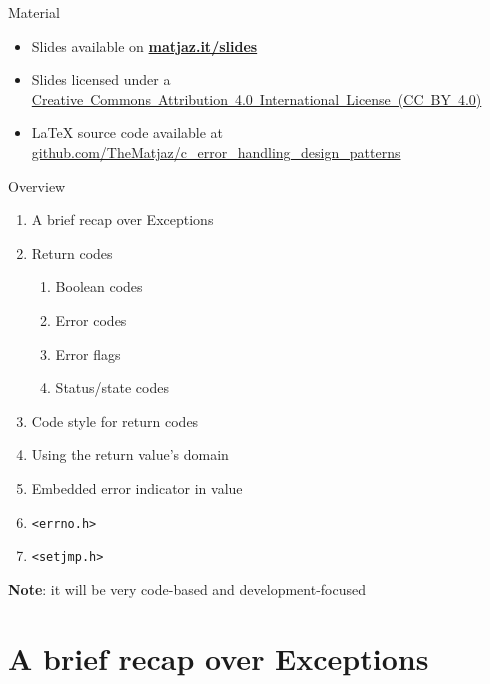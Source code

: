 \documentclass[aspectratio=169,14pt]{beamer}
\begin{document}
\begin{frame}
\titlepage
\end{frame}



\begin{frame}[label=material]{Material}
\begin{itemize}
    \item Slides available on \href{https://matjaz.it/slides/}{\textbf{matjaz.it/slides}} 
    \item Slides licensed under a 
    \href{https://creativecommons.org/licenses/by/4.0/}{Creative~Commons~Attribution~4.0~International~License~(CC~BY~4.0)}
    \item LaTeX source code available at
    \href{https://github.com/TheMatjaz/c_error_handling_design_patterns}{github.com/TheMatjaz/c\_error\_handling\_design\_patterns}
\end{itemize}
\end{frame}



\begin{frame}{Overview}
\begin{enumerate}
    \item A brief recap over Exceptions
    \item Return codes\\
    \begin{enumerate}
        \item Boolean codes
        \item Error codes
        \item Error flags
        \item Status/state codes
    \end{enumerate}
    \item Code style for return codes
    \item Using the return value's domain
    \item Embedded error indicator in value
    \item \texttt{<errno.h>}
    \item \texttt{<setjmp.h>}
\end{enumerate}

\textbf{Note}: it will be very code-based and development-focused
\end{frame}





\section{A brief recap over Exceptions}
\end{document}
